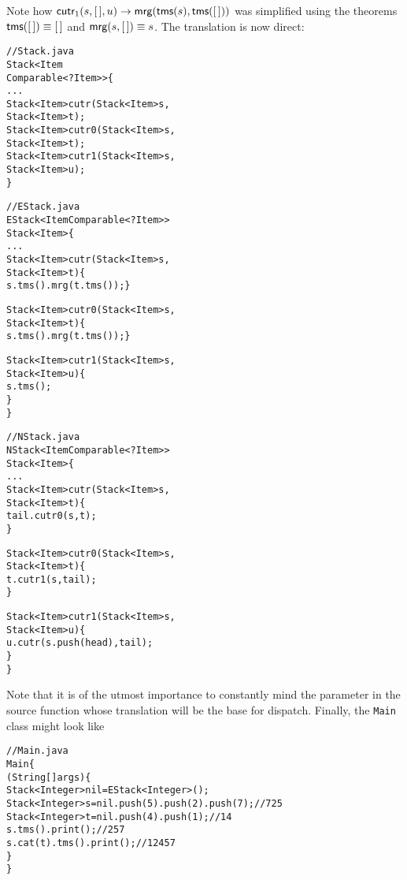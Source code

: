 Note how \(\textsf{cutr}_1(s,[\,],u) \rightarrow
\textsf{mrg}(\textsf{tms}(s),\textsf{tms}([\,]))\) was simplified using the
theorems \(\textsf{tms}([\,]) \equiv [\,]\) and \(\textsf{mrg}(s,[\,]) \equiv
s\). The translation is now direct:
\begin{alltt}
// Stack.java
\public \abstractX \class Stack<Item
\hfill\extends Comparable<? \super Item>> \{
  ...
  \public    \abstractX Stack<Item> cutr(\final Stack<Item> s,
                                      \final Stack<Item> t);
  \protectedX \abstractX Stack<Item> cutr0(\final Stack<Item> s,
                                       \final Stack<Item> t);
  \protectedX \abstractX Stack<Item> cutr1(\final Stack<Item> s,
                                       \final Stack<Item> u);
\}

// EStack.java
\public \class EStack<Item \extends Comparable<? \super Item>>
       \extends Stack<Item> \{
  ...
  \public Stack<Item> cutr(\final Stack<Item> s,
                          \final Stack<Item> t) \{
    \return s.tms().mrg(t.tms()); \}

  \protectedX Stack<Item> cutr0(\final Stack<Item> s,
                              \final Stack<Item> t) \{
    \return s.tms().mrg(t.tms()); \}

  \protectedX Stack<Item> cutr1(\final Stack<Item> s,
                              \final Stack<Item> u) \{
    \return s.tms();
  \}
\}

// NStack.java
\public \class NStack<Item \extends Comparable<? \super Item>>
       \extends Stack<Item> \{
  ...
  \public Stack<Item> cutr(\final Stack<Item> s,
                          \final Stack<Item> t) \{
    \return tail.cutr0(s,t);
  \}

  \protectedX Stack<Item> cutr0(\final Stack<Item> s,
                              \final Stack<Item> t) \{
    \return t.cutr1(s,tail);
  \}

  \protectedX Stack<Item> cutr1(\final Stack<Item> s,
                              \final Stack<Item> u) \{
    \return u.cutr(s.push(head),tail);
  \}
\}
\end{alltt}
Note that it is of the utmost importance to constantly mind the
parameter in the source function whose translation will be the base
for dispatch. Finally, the \texttt{Main} class might look like
\begin{alltt}
// Main.java
\public \class Main \{
  \public \static \void \main (String[] args) \{
    Stack<Integer> nil = \new EStack<Integer>();
    Stack<Integer> s = nil.push(5).push(2).push(7);\hfill// 7 2 5
    Stack<Integer> t = nil.push(4).push(1);\hfill// 1 4
    s.tms().print();\hfill// 2 5 7
    s.cat(t).tms().print();\hfill// 1 2 4 5 7
  \}
\}
\end{alltt}
